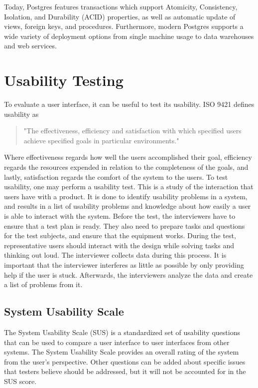 Today, Postgres features transactions which support Atomicity, Consistency, Isolation, and Durability (ACID) properties, as well as automatic update of views, foreign keys, and procedures.
Furthermore, modern Postgres supports a wide variety of deployment options from single machine usage to data warehouses and web services\cite{Postgres_Docs}.

\section*{Usability Testing}
To evaluate a user interface, it can be useful to test its usability. ISO 9421 defines usability as
\begin{quote}
	"The effectiveness, efficiency and satisfaction with which specified users achieve specified goals in particular environments."
\end{quote}

Where effectiveness regards how well the users accomplished their goal, efficiency regards the resources expended in relation to the completeness of the goals, and lastly, satisfaction regards the comfort of the system to the users.
To test usability, one may perform a usability test. This is a study of the interaction that users have with a product. It is done to identify usability problems in a system, and results in a list of usability problems and knowledge about how easily a user is able to interact with the system.
Before the test, the interviewers have to ensure that a test plan is ready.
They also need to prepare tasks and questions for the test subjects, and ensure that the equipment works.
During the test, representative users should interact with the design while solving tasks and thinking out loud. The interviewer collects data during this process. It is important that the interviewer interferes as little as possible by only providing help if the user is stuck.
Afterwards, the interviewers analyze the data and create a list of problems from it.
\cite{deb7}

\subsection*{System Usability Scale} \label{SUSScore}
The System Usability Scale (SUS) is a standardized set of usability questions that can be used to compare a user interface to user interfaces from other systems.
The System Usability Scale provides an overall rating of the system from the user's perspective.
Other questions can be added about specific issues that testers believe should be addressed, but it will not be accounted for in the SUS score.\cite{adobeSUS}

